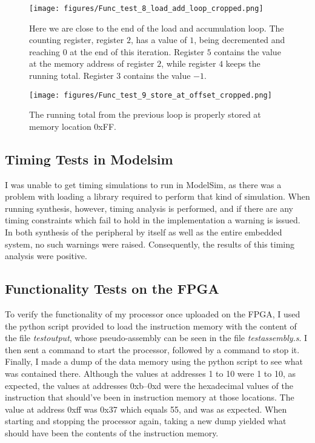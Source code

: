 \documentclass[11pt]{article}
\begin{document}
\begin{figure}[pht]
  \centering
  \texttt{[image: figures/Func\_test\_8\_load\_add\_loop\_cropped.png]}
  \caption{\label{fig:accloop} Here we are close to the end of the load
    and accumulation loop. The counting register, register $2$, has a
    value of $1$, being decremented and reaching $0$ at the end of this
    iteration. Register $5$ contains the value at the memory address of
    register $2$, while register $4$ keeps the running total. Register $3$
    contains the value $-1$.}
\end{figure}

\begin{figure}[pht]
  \centering
  \texttt{[image: figures/Func\_test\_9\_store\_at\_offset\_cropped.png]}
  \caption{\label{fig:totalstored} The running total from the previous loop is
    properly stored at memory location 0xFF.}
\end{figure}

\subsection{Timing Tests in Modelsim}
\label{subsec:timingtestsim}
I was unable to get timing simulations to run in ModelSim, as there
was a problem with loading a library required to perform that kind of
simulation. When running synthesis, however, timing analysis is
performed, and if there are any timing constraints which fail to hold
in the implementation a warning is issued. In both synthesis of the
peripheral by itself as well as the entire embedded system, no such
warnings were raised. Consequently, the results of this timing
analysis were positive. 

\subsection{Functionality Tests on the FPGA}
\label{subsec:functestfpga}
To verify the functionality of my processor once uploaded on the FPGA,
I used the python script provided to load the instruction memory with
the content of the file {\em testoutput}, whose pseudo-assembly can be
seen in the file {\em testassembly.s}. I then sent a command to start
the processor, followed by a command to stop it. Finally, I made a
dump of the data memory using the python script to see what was
contained there. Although the values at addresses 1 to 10 were 1 to
10, as expected, the values at addresses 0xb--0xd were the hexadecimal
values of the instruction that should've been in instruction memory at
those locations. The value at address 0xff was 0x37 which equals 55,
and was as expected. When starting and stopping the processor again,
taking a new dump yielded what should have been the contents of the
instruction memory.
\end{document}
